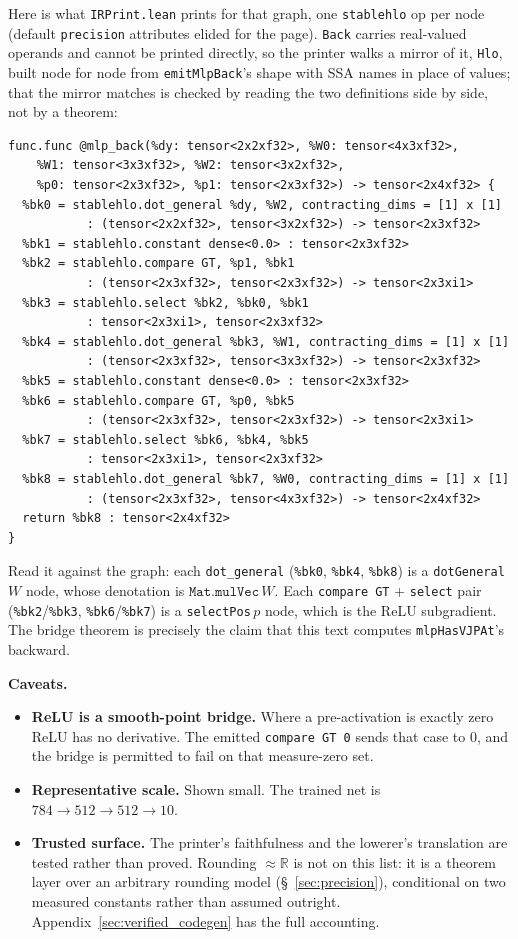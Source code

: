 Here is what \texttt{IRPrint.lean} prints for that graph, one
\texttt{stablehlo} op per node (default \texttt{precision} attributes
elided for the page). \texttt{Back} carries real-valued operands and cannot
be printed directly, so the printer walks a mirror of it, \texttt{Hlo},
built node for node from \texttt{emitMlpBack}'s shape with SSA names in
place of values; that the mirror matches is checked by reading the two
definitions side by side, not by a theorem:

\begin{verbatim}
func.func @mlp_back(%dy: tensor<2x2xf32>, %W0: tensor<4x3xf32>,
    %W1: tensor<3x3xf32>, %W2: tensor<3x2xf32>,
    %p0: tensor<2x3xf32>, %p1: tensor<2x3xf32>) -> tensor<2x4xf32> {
  %bk0 = stablehlo.dot_general %dy, %W2, contracting_dims = [1] x [1]
           : (tensor<2x2xf32>, tensor<3x2xf32>) -> tensor<2x3xf32>
  %bk1 = stablehlo.constant dense<0.0> : tensor<2x3xf32>
  %bk2 = stablehlo.compare GT, %p1, %bk1
           : (tensor<2x3xf32>, tensor<2x3xf32>) -> tensor<2x3xi1>
  %bk3 = stablehlo.select %bk2, %bk0, %bk1
           : tensor<2x3xi1>, tensor<2x3xf32>
  %bk4 = stablehlo.dot_general %bk3, %W1, contracting_dims = [1] x [1]
           : (tensor<2x3xf32>, tensor<3x3xf32>) -> tensor<2x3xf32>
  %bk5 = stablehlo.constant dense<0.0> : tensor<2x3xf32>
  %bk6 = stablehlo.compare GT, %p0, %bk5
           : (tensor<2x3xf32>, tensor<2x3xf32>) -> tensor<2x3xi1>
  %bk7 = stablehlo.select %bk6, %bk4, %bk5
           : tensor<2x3xi1>, tensor<2x3xf32>
  %bk8 = stablehlo.dot_general %bk7, %W0, contracting_dims = [1] x [1]
           : (tensor<2x3xf32>, tensor<4x3xf32>) -> tensor<2x4xf32>
  return %bk8 : tensor<2x4xf32>
}
\end{verbatim}

\noindent Read it against the graph: each \texttt{dot\_general}
(\texttt{\%bk0}, \texttt{\%bk4}, \texttt{\%bk8}) is a
\texttt{dotGeneral}\,$W$ node, whose denotation is
$\texttt{Mat.mulVec}\,W$. Each \texttt{compare GT} + \texttt{select}
pair (\texttt{\%bk2}/\texttt{\%bk3}, \texttt{\%bk6}/\texttt{\%bk7}) is a
\texttt{selectPos}\,$p$ node, which is the ReLU subgradient. The bridge
theorem is precisely the claim that this text computes
\texttt{mlpHasVJPAt}'s backward.

\medskip\noindent\textbf{Caveats.}
\begin{itemize}
  \item \textbf{ReLU is a smooth-point bridge.} Where a pre-activation is
    exactly zero ReLU has no derivative. The emitted \texttt{compare GT 0}
    sends that case to $0$, and the bridge is permitted to fail on that
    measure-zero set.
  \item \textbf{Representative scale.} Shown small. The trained net is
    $784{\to}512{\to}512{\to}10$.
  \item \textbf{Trusted surface.} The printer's faithfulness and the
    lowerer's translation are tested rather than proved. Rounding
    $\approx \mathbb{R}$ is not on this list: it is a theorem layer
    over an arbitrary rounding model (\S~\ref{sec:precision}), conditional on
    two measured constants rather than assumed outright. Appendix~\ref{sec:verified_codegen} has the
    full accounting.
\end{itemize}

